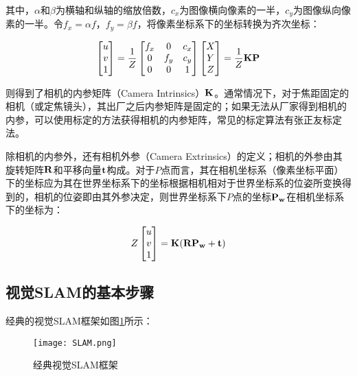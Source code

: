 其中，$\alpha$和$\beta$为横轴和纵轴的缩放倍数，$c_x$为图像横向像素的一半，$c_y$为图像纵向像素的一半。令$f_x=\alpha f$，$f_y=\beta f$，将像素坐标系下的坐标转换为齐次坐标：

\begin{equation}
\begin{bmatrix}
u\\v\\1
\end{bmatrix}=
\frac{1}{Z}
\begin{bmatrix}
f_x & 0 & c_x\\
0   & f_y & c_y\\
0 & 0 & 1
\end{bmatrix}
\begin{bmatrix}
X\\Y\\Z
\end{bmatrix}=
\frac{1}{Z} \bf{KP}
\end{equation}


则得到了相机的内参矩阵（Camera Intrinsics）$\bf{K}$。通常情况下，对于焦距固定的相机（或定焦镜头），其出厂之后内参矩阵是固定的；如果无法从厂家得到相机的内参，可以使用标定的方法获得相机的内参矩阵，常见的标定算法有张正友标定法\cite{Gao2017SLAM}。

除相机的内参外，还有相机外参（Camera Extrinsics）的定义；相机的外参由其旋转矩阵$\bf{R}$和平移向量$\bf{t}$构成。对于$P$点而言，其在相机坐标系（像素坐标平面）下的坐标应为其在世界坐标系下的坐标根据相机相对于世界坐标系的位姿所变换得到的，相机的位姿即由其外参决定，则世界坐标系下$P$点的坐标$\bf{P_w}$在相机坐标系下的坐标为：


\begin{equation}
Z
\begin{bmatrix}
u\\v\\1
\end{bmatrix}=
\bf{K(RP_w+t)}
\end{equation}

\subsection{视觉SLAM的基本步骤} \label{3.1.3}

经典的视觉SLAM框架如图\ref{fig5}所示：

\begin{figure}[!ht]
	\centering
	\texttt{[image: SLAM.png]}
	\caption{经典视觉SLAM框架} 
	\label{fig5}
\end{figure}

